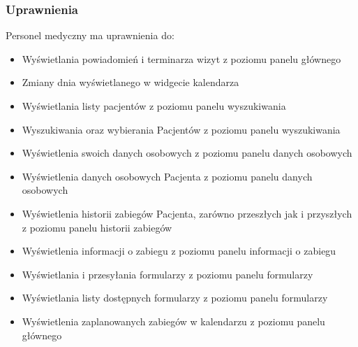 \subsubsection{Uprawnienia}
Personel medyczny ma uprawnienia do:\begin{itemize}
    \item Wyświetlania powiadomień i terminarza wizyt z poziomu panelu głównego
    \item Zmiany dnia wyświetlanego w widgecie kalendarza
    \item Wyświetlania listy pacjentów z poziomu panelu wyszukiwania
    \item Wyszukiwania oraz wybierania Pacjentów z poziomu panelu wyszukiwania
    \item Wyświetlenia swoich danych osobowych z poziomu panelu danych osobowych
    \item Wyświetlenia danych osobowych Pacjenta z poziomu panelu danych osobowych
    \item Wyświetlenia historii zabiegów Pacjenta, zarówno przeszłych jak i przyszłych z poziomu panelu historii zabiegów
    \item Wyświetlenia informacji o zabiegu z poziomu panelu informacji o zabiegu
    \item Wyświetlania i przesyłania formularzy z poziomu panelu formularzy
    \item Wyświetlania listy dostępnych formularzy z poziomu panelu formularzy
    \item Wyświetlenia zaplanowanych zabiegów w kalendarzu z poziomu panelu głównego
\end{itemize}
